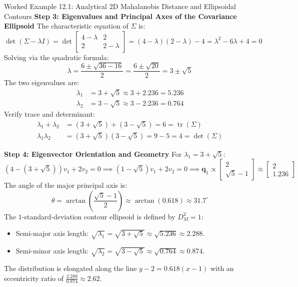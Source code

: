 \begin{examplebox}[breakable]{Worked Example 12.1: Analytical 2D Mahalanobis Distance and Ellipsoidal Contours}
\textbf{Step 3: Eigenvalues and Principal Axes of the Covariance Ellipsoid}
The characteristic equation of $\Sigma$ is:
\begin{equation}
\det(\Sigma - \lambda I) = \det\begin{bmatrix} 4 - \lambda & 2 \\ 2 & 2 - \lambda \end{bmatrix} = (4 - \lambda)(2 - \lambda) - 4 = \lambda^2 - 6\lambda + 4 = 0
\end{equation}
Solving via the quadratic formula:
\begin{equation}
\lambda = \frac{6 \pm \sqrt{36 - 16}}{2} = \frac{6 \pm \sqrt{20}}{2} = 3 \pm \sqrt{5}
\end{equation}
The two eigenvalues are:
\begin{align}
\lambda_1 &= 3 + \sqrt{5} \approx 3 + 2.236 = 5.236 \\
\lambda_2 &= 3 - \sqrt{5} \approx 3 - 2.236 = 0.764
\end{align}
Verify trace and determinant:
\begin{align}
\lambda_1 + \lambda_2 &= (3 + \sqrt{5}) + (3 - \sqrt{5}) = 6 = \operatorname{tr}(\Sigma) \\
\lambda_1 \lambda_2 &= (3 + \sqrt{5})(3 - \sqrt{5}) = 9 - 5 = 4 = \det(\Sigma)
\end{align}

\textbf{Step 4: Eigenvector Orientation and Geometry}
For $\lambda_1 = 3 + \sqrt{5}$:
\begin{equation}
(4 - (3 + \sqrt{5}))v_1 + 2v_2 = 0 \implies (1 - \sqrt{5})v_1 + 2v_2 = 0 \implies \mathbf{q}_1 \propto \begin{bmatrix} 2 \\ \sqrt{5} - 1 \end{bmatrix} \approx \begin{bmatrix} 2 \\ 1.236 \end{bmatrix}
\end{equation}
The angle of the major principal axis is:
\begin{equation}
\theta = \arctan\left(\frac{\sqrt{5}-1}{2}\right) \approx \arctan(0.618) \approx 31.7^\circ
\end{equation}
The $1$-standard-deviation contour ellipsoid is defined by $D_M^2 = 1$:
\begin{itemize}
    \item Semi-major axis length: $\sqrt{\lambda_1} = \sqrt{3 + \sqrt{5}} \approx \sqrt{5.236} \approx 2.288$.
    \item Semi-minor axis length: $\sqrt{\lambda_2} = \sqrt{3 - \sqrt{5}} \approx \sqrt{0.764} \approx 0.874$.
\end{itemize}
The distribution is elongated along the line $y - 2 = 0.618(x - 1)$ with an eccentricity ratio of $\frac{2.288}{0.874} \approx 2.62$.
\end{examplebox}

